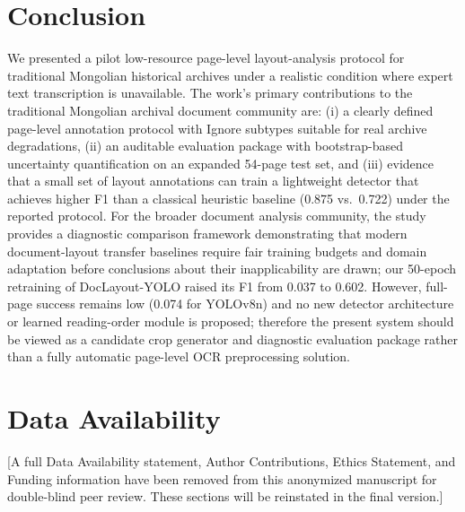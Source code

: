 \documentclass[pdflatex,sn-mathphys-num]{sn-jnl}
\begin{document}
\section{Conclusion}
We presented a pilot low-resource page-level layout-analysis protocol for traditional Mongolian historical archives under a realistic condition where expert text transcription is unavailable. The work's primary contributions to the traditional Mongolian archival document community are: (i) a clearly defined page-level annotation protocol with Ignore subtypes suitable for real archive degradations, (ii) an auditable evaluation package with bootstrap-based uncertainty quantification on an expanded 54-page test set, and (iii) evidence that a small set of layout annotations can train a lightweight detector that achieves higher F1 than a classical heuristic baseline (0.875 vs.~0.722) under the reported protocol. For the broader document analysis community, the study provides a diagnostic comparison framework demonstrating that modern document-layout transfer baselines require fair training budgets and domain adaptation before conclusions about their inapplicability are drawn; our 50-epoch retraining of DocLayout-YOLO raised its F1 from 0.037 to 0.602. However, full-page success remains low (0.074 for YOLOv8n) and no new detector architecture or learned reading-order module is proposed; therefore the present system should be viewed as a candidate crop generator and diagnostic evaluation package rather than a fully automatic page-level OCR preprocessing solution.


\section*{Data Availability}
[A full Data Availability statement, Author Contributions, Ethics Statement, and Funding information have been removed from this anonymized manuscript for double-blind peer review. These sections will be reinstated in the final version.]

\clearpage
\end{document}

